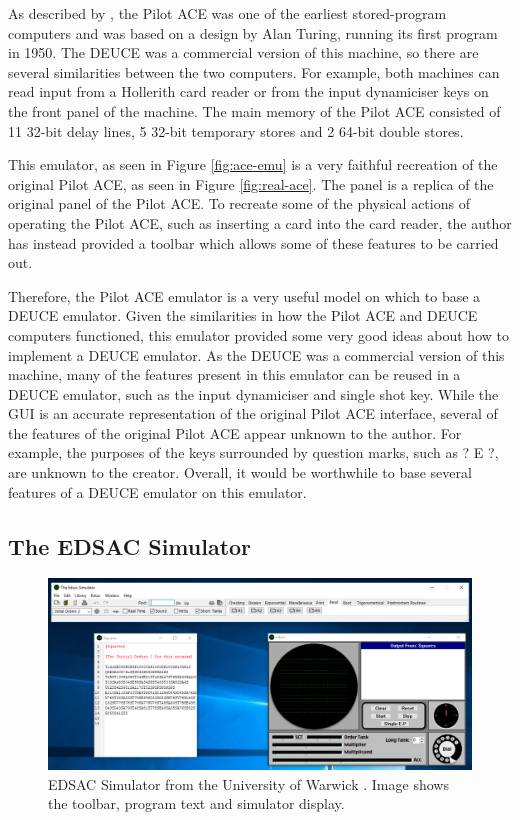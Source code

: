\documentclass{l4proj}
\begin{document}
As described by \citet{VowelsAce05}, the Pilot ACE was one of the earliest stored-program computers and was based on a design by Alan Turing, running its first program in 1950. The DEUCE was a commercial version of this machine, so there are several similarities between the two computers. For example, both machines can read input from a Hollerith card reader or from the input dynamiciser keys on the front panel of the machine. The main memory of the Pilot ACE consisted of 11 32-bit delay lines, 5 32-bit temporary stores and 2 64-bit double stores.

This emulator, as seen in Figure \ref{fig:ace-emu} is a very faithful recreation of the original Pilot ACE, as seen in Figure \ref{fig:real-ace}. The panel is a replica of the original panel of the Pilot ACE. To recreate some of the physical actions of operating the Pilot ACE, such as inserting a card into the card reader, the author has instead provided a toolbar which allows some of these features to be carried out.

Therefore, the Pilot ACE emulator is a very useful model on which to base a DEUCE emulator. Given the similarities in how the Pilot ACE and DEUCE computers functioned, this emulator provided some very good ideas about how to implement a DEUCE emulator. As the DEUCE was a commercial version of this machine, many of the features present in this emulator can be reused in a DEUCE emulator, such as the input dynamiciser and single shot key. While the GUI is an accurate representation of the original Pilot ACE interface, several of the features of the original Pilot ACE appear unknown to the author. For example, the purposes of the keys surrounded by question marks, such as ? E ?, are unknown to the creator. Overall, it would be worthwhile to base several features of a DEUCE emulator on this emulator.


\subsection{The EDSAC Simulator}
\begin{figure}[h!]
	\centering
	\includegraphics[width=\linewidth]{images/edsac-emu}
	\caption{EDSAC Simulator from the University of Warwick \citep{Warwick16}. Image shows the toolbar, program text and simulator display.}
	\label{fig:edsac}
\end{figure}
\end{document}

